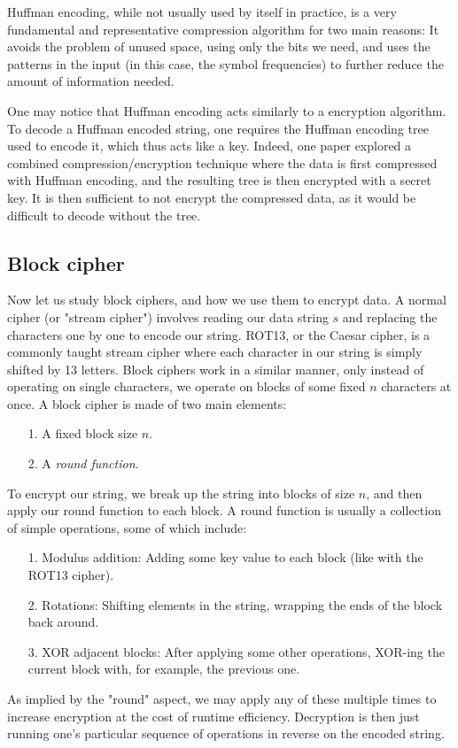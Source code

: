 \documentclass[11pt]{article}
\begin{document}
Huffman encoding, while not usually used by itself in practice, is a very fundamental and representative compression 
algorithm for two main reasons: It avoids the problem of unused space, using only the bits we need, and 
uses the patterns in the input (in this case, the symbol frequencies) to further reduce the amount of information needed.

One may notice that Huffman encoding acts similarly to a encryption algorithm. To decode a Huffman encoded string, 
one requires the Huffman encoding tree used to encode it, which thus acts like a key. Indeed, one paper\cite{sangwan} explored 
a combined compression/encryption technique where the data is first compressed with Huffman encoding, and the 
resulting tree is then encrypted with a secret key. It is then sufficient to not encrypt the compressed data, 
as it would be difficult to decode without the tree.

\subsection{Block cipher}\label{block-cipher-subsect}
Now let us study block ciphers, and how we use them to encrypt data. A normal cipher (or "stream cipher") involves 
reading our data string $s$ and replacing the characters one by one to encode our string. 
ROT13, or the Caesar cipher, is a commonly taught stream cipher where each character in our string is 
simply shifted by 13 letters. Block ciphers work in a similar manner, only instead of operating on single 
characters, we operate on blocks of some fixed $n$ characters at once. 
A block cipher is made of two main elements:
\begin{itemize}
	\item[1.] A fixed block size $n$.
	\item[2.] A \emph{round function}.
\end{itemize}
To encrypt our string, we break up the string into blocks of size $n$, and then apply our round function to each block. 
A round function is usually a collection of simple operations, some of which include:
\begin{itemize}
	\item[1.] Modulus addition: Adding some key value to each block (like with the ROT13 cipher).
	\item[2.] Rotations: Shifting elements in the string, wrapping the ends of the block back around.
	\item[3.] XOR adjacent blocks: After applying some other operations, XOR-ing the current block with, 
for example, the previous one. 
\end{itemize}
As implied by the "round" aspect, we may apply any of these multiple times to increase encryption at the cost 
of runtime efficiency. Decryption is then just running one's particular sequence of operations in reverse on the 
encoded string.
\end{document}
